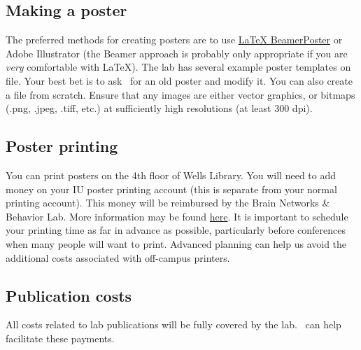 \documentclass{tufte-book} %
\begin{document}
 \subsection{Making a poster}
  The preferred methods for creating posters are to use \href{https://github.com/deselaers/latex-beamerposter}{LaTeX BeamerPoster} or Adobe Illustrator (the Beamer approach is probably only appropriate if you are \emph{very} comfortable with LaTeX). The lab has several example poster templates on file. Your best bet is to ask \director~for an old poster and modify it. You can also create a file from scratch. Ensure that any images are either vector graphics, or bitmaps (.png, .jpeg, .tiff, etc.) at sufficiently high resolutions (at least 300 dpi).


 \subsection{Poster printing}
You can print posters on the 4th floor of Wells Library. You will need to add money on your IU poster printing account (this is separate from your normal printing account). This money will be reimbursed by the Brain Networks \& Behavior Lab. More information may be found \href{https://libraries.indiana.edu/computing-and-printing}{here}. It is important to schedule your printing time as far in advance as possible, particularly before conferences when many people will want to print. Advanced planning can help us avoid the additional costs associated with off-campus printers. 


 \subsection{Publication costs}
All costs related to lab publications will be fully covered by the lab. \director~can help facilitate these payments.
\end{document}
